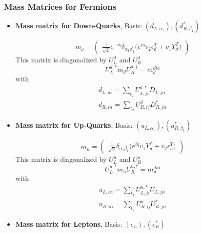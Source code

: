 \subsubsection{Mass Matrices for Fermions}
\begin{itemize} 
\item {\bf Mass matrix for Down-Quarks}, Basis: \( \left(d_{L,{{\alpha_1}}}\right), \left(d^*_{R,{{\beta_1}}}\right) \) 
 
\begin{equation} 
m_{d} = \left( 
\begin{array}{c}
\frac{1}{\sqrt{2}} e^{-i \eta } \delta_{{\alpha_1} {\beta_1}} \Big(e^{i \eta } v_2 \epsilon_{d}^{T}  + v_1 Y_{d}^{T} \Big)\end{array} 
\right) 
 \end{equation} 
This matrix is diagonalized by \(U^d_L\) and \(U^d_R\) 
\begin{equation} 
U^{d,*}_L m_{d} U_{R}^{d,\dagger} = m^{dia}_{d} 
\end{equation} 
with 
\begin{align} 
d_{L,{i \alpha}} = \sum_{t_2}U^{d,*}_{L,{j i}}D_{L,{j \alpha}}\\ 
d_{R,{i \alpha}} = \sum_{t_2}U_{R,{i j}}^{d}D^*_{R,{j \alpha}}
\end{align} 
\item {\bf Mass matrix for Up-Quarks}, Basis: \( \left(u_{L,{{\alpha_1}}}\right), \left(u^*_{R,{{\beta_1}}}\right) \) 
 
\begin{equation} 
m_{u} = \left( 
\begin{array}{c}
\frac{1}{\sqrt{2}} \delta_{{\alpha_1} {\beta_1}} \Big(e^{i \eta } v_1 Y_{u}^{T}  + v_2 \epsilon_{u}^{T} \Big)\end{array} 
\right) 
 \end{equation} 
This matrix is diagonalized by \(U^u_L\) and \(U^u_R\) 
\begin{equation} 
U^{u,*}_L m_{u} U_{R}^{u,\dagger} = m^{dia}_{u} 
\end{equation} 
with 
\begin{align} 
u_{L,{i \alpha}} = \sum_{t_2}U^{u,*}_{L,{j i}}U_{L,{j \alpha}}\\ 
u_{R,{i \alpha}} = \sum_{t_2}U_{R,{i j}}^{u}U^*_{R,{j \alpha}}
\end{align} 
\item {\bf Mass matrix for Leptons}, Basis: \( \left(e_L\right), \left(e_R^*\right) \) 
 

\end{itemize}
